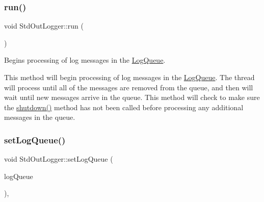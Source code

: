 \subsubsection{\texorpdfstring{run()}{run()}}
{\footnotesize\ttfamily void Std\+Out\+Logger\+::run (\begin{DoxyParamCaption}{ }\end{DoxyParamCaption})\hspace{0.3cm}{\ttfamily [private]}}



Begins processing of log messages in the \hyperlink{class_aws_1_1_iot_1_1_device_client_1_1_logging_1_1_log_queue}{Log\+Queue}. 

This method will begin processing of log messages in the \hyperlink{class_aws_1_1_iot_1_1_device_client_1_1_logging_1_1_log_queue}{Log\+Queue}. The thread will process until all of the messages are removed from the queue, and then will wait until new messages arrive in the queue. This method will check to make sure the \hyperlink{class_aws_1_1_iot_1_1_device_client_1_1_logging_1_1_std_out_logger_ae0e55f2d2a1ce818ddb4ed14c293051f}{shutdown()} method has not been called before processing any additional messages in the queue. \mbox{\label{class_aws_1_1_iot_1_1_device_client_1_1_logging_1_1_std_out_logger_aa35c525dc9aa3fef0f1f244781d304ea}} 
\subsubsection{\texorpdfstring{set\+Log\+Queue()}{setLogQueue()}}
{\footnotesize\ttfamily void Std\+Out\+Logger\+::set\+Log\+Queue (\begin{DoxyParamCaption}\item[{std\+::unique\+\_\+ptr$<$ \hyperlink{class_aws_1_1_iot_1_1_device_client_1_1_logging_1_1_log_queue}{Log\+Queue} $>$}]{log\+Queue }\end{DoxyParamCaption})\hspace{0.3cm}{\ttfamily [override]}, {\ttfamily [virtual]}}



